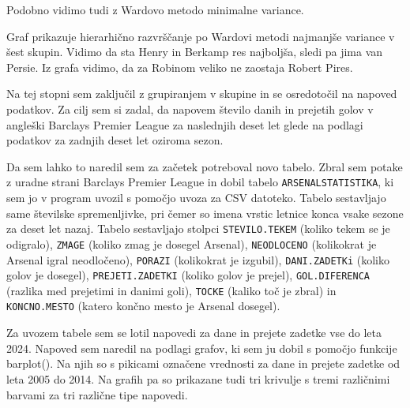 \documentclass[11pt,a4paper]{article}
\begin{document}
Podobno vidimo tudi z Wardovo metodo minimalne variance. 


Graf prikazuje hierarhično razvrščanje po Wardovi metodi najmanjše variance v šest skupin.
Vidimo da sta Henry in Berkamp res najboljša, sledi pa jima van Persie. Iz grafa vidimo, da za Robinom veliko ne zaostaja Robert Pires.

\newpage
Na tej stopni sem zaključil z grupiranjem v skupine in se osredotočil na napoved podatkov. Za cilj sem si zadal, da napovem število danih in prejetih golov v angleški Barclays Premier League za naslednjih deset let glede na podlagi podatkov za zadnjih deset let oziroma sezon.

Da sem lahko to naredil sem za začetek potreboval novo tabelo. Zbral sem potake z uradne strani  
Barclays Premier League in dobil tabelo \texttt{AR\-SE\-NAL\-STA\-TIST\-IKA}, ki sem jo v program uvozil s pomočjo uvoza za CSV datoteko. Tabelo sestavljajo same številske spremenljivke, pri čemer so imena vrstic letnice konca vsake sezone za deset let nazaj. Tabelo sestavljajo stolpci \verb|STEVILO.TEKEM| (koliko tekem se je odigralo), \verb|ZMAGE| (koliko zmag je dosegel Arsenal), \verb|NEODLOCENO| (kolikokrat je Arsenal igral neodločeno), \verb|PORAZI| (kolikokrat je izgubil), \verb|DANI.ZADETKi| (koliko golov je dosegel), \verb|PREJETI.ZADETKI| (koliko golov je prejel), \verb|GOL.DIFERENCA| (razlika med prejetimi in danimi goli), \verb|TOCKE| (kaliko toč je zbral) in \verb|KONCNO.MESTO| (katero končno mesto je Arsenal dosegel).

Za uvozem tabele sem se lotil napovedi za dane in prejete zadetke vse do leta 2024. Napoved sem naredil na podlagi grafov, ki sem ju dobil s pomočjo funkcije barplot(). Na njih so s pikicami označene vrednosti za dane in prejete zadetke od leta 2005 do 2014. Na grafih pa so prikazane tudi tri krivulje s tremi različnimi barvami za tri različne tipe napovedi.

\end{document}

